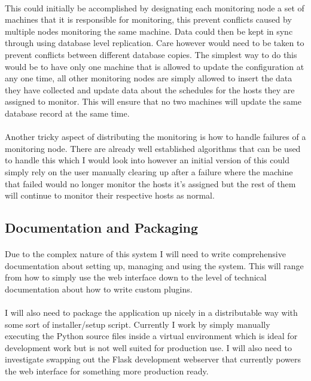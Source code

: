\documentclass[bsc,logo,twoside]{infthesis}
\begin{document}
\paragraph*{}
	This could initially be accomplished by designating each monitoring node a set
	of machines that it is responsible for monitoring, this prevent conflicts
	caused by multiple nodes monitoring the same machine.  Data could then be kept
	in sync through using database level replication.  Care however would need to
	be taken to prevent conflicts between different database copies. The simplest
	way to do this would be to have only one machine that is allowed to update the
	configuration at any one time, all other monitoring nodes are simply allowed
	to insert the data they have collected and update data about the schedules for
	the hosts they are assigned to monitor.  This will ensure that no two machines
	will update the same database record at the same time.
	
\paragraph*{}
	Another tricky aspect of distributing the monitoring is how to handle failures
	of a monitoring node.  There are already well established algorithms that can
	be used to handle this which I would look into however an initial version of
	this could simply rely on the user manually clearing up after a failure where
	the machine that failed would no longer monitor the hosts it's assigned but
	the rest of them will continue to monitor their respective hosts as normal.
	
\subsection{Documentation and Packaging}
\paragraph*{}
	Due to the complex nature of this system I will need to write comprehensive
	documentation about setting up, managing and using the system.  This will
	range from how to simply use the web interface down to the level of technical
	documentation about how to write custom plugins.
	
\paragraph*{}
	I will also need to package the application up nicely in a distributable way
	with some sort of installer/setup script.  Currently I work by simply manually
	executing the Python source files inside a virtual environment which is ideal
	for development work but is not well suited for production use.  I will also
	need to investigate swapping out the Flask development webserver that
	currently powers the web interface for something more production ready.
	
\end{document}
